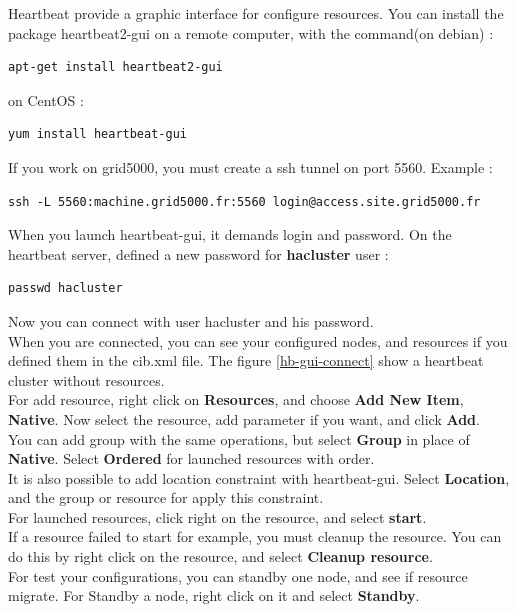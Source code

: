 \documentclass[a4paper,10pt]{report}
\begin{document}
Heartbeat provide a graphic interface for configure resources. You can install the package heartbeat2-gui on a remote computer, with the command(on debian) :
\begin{lstlisting}
apt-get install heartbeat2-gui
\end{lstlisting}
on CentOS :
\begin{lstlisting}
yum install heartbeat-gui
\end{lstlisting}
If you work on grid5000, you must create a ssh tunnel on port 5560. Example :
\begin{lstlisting}
ssh -L 5560:machine.grid5000.fr:5560 login@access.site.grid5000.fr
\end{lstlisting}
When you launch heartbeat-gui, it demands login and password. On the heartbeat server, defined a new password for \textbf{hacluster} user :
\begin{lstlisting}
passwd hacluster
\end{lstlisting}
Now you can connect with user hacluster and his password.\\

When you are connected, you can see your configured nodes, and resources if you defined them in the cib.xml file. The figure \ref{hb-gui-connect} show a heartbeat cluster without resources.\\

For add resource, right click on \textbf{Resources}, and choose \textbf{Add New Item}, \textbf{Native}. Now select the resource, add parameter if you want, and click \textbf{Add}.\\
You can add group with the same operations, but select \textbf{Group} in place of \textbf{Native}. Select \textbf{Ordered} for launched resources with order.\\

It is also possible to add location constraint with heartbeat-gui. Select \textbf{Location}, and the group or resource for apply this constraint.\\

For launched resources, click right on the resource, and select \textbf{start}.\\

If a resource failed to start for example, you must cleanup the resource. You can do this by right click on the resource, and select \textbf{Cleanup resource}.\\

For test your configurations, you can standby one node, and see if resource migrate. For Standby a node, right click on it and select \textbf{Standby}.
\end{document}

